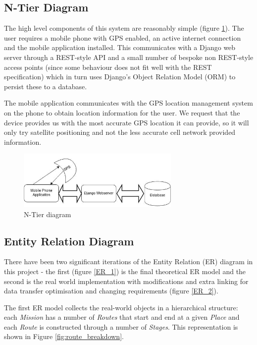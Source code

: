 \subsection{N-Tier Diagram}
The high level components of this system are reasonably simple (figure
\ref{NTier}). The
user requires a mobile phone with GPS enabled, an active internet
connection and the mobile application installed. This communicates
with a Django web server through a REST-style API and a small number of
bespoke non REST-style access points (since some behaviour does not
fit well with the REST specification) which in turn uses Django's
Object Relation Model (ORM) to persist these to a database.

The mobile application communicates with the GPS location
management system on the phone to obtain location information for the
user. We request that the device provides us with the most
accurate GPS location it can provide, so it will only try satellite
positioning and not the less accurate cell network provided information.
\begin{figure}[H]
  \centering
  \includegraphics[width=0.7\textwidth]{images/n-tier.jpg}
  \caption{N-Tier diagram}
  \label{NTier}
\end{figure}

\subsection{Entity Relation Diagram}
\label{sec:ER}
There have been two significant iterations of the Entity Relation (ER)
diagram in this project - the first (figure \ref{ER_1}) is the final
theoretical ER model and the second is the real world implementation
with modifications and extra linking for data transfer optimisation
and changing requirements (figure \ref{ER_2}).

The first ER model collects the real-world objects in a hierarchical
structure: each \emph{Mission} has a number of \emph{Routes} that
start and end at a given \emph{Place} and each \emph{Route} is
constructed through a number of \emph{Stages}. This representation
is shown in Figure \ref{fig:route_breakdown}.

